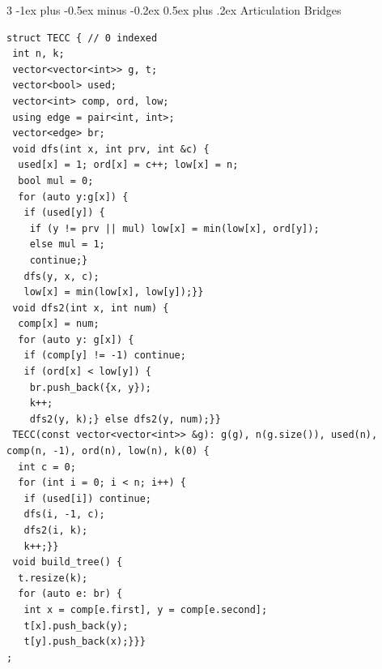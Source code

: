 \documentclass[8pt,a4paper,onesided]{article}
\makeatletter
\renewcommand{\subsection}{\@startsection{subsection}{2}{0mm}
    {-1ex plus -0.5ex minus -0.2ex} %
    {0.5ex plus .2ex}                %
    {\normalfont\large\bfseries}}    %
\makeatother
\begin{document}
\begin{multicols}{3}
\subsection{Articulation Bridges}
\begin{verbatim}
struct TECC { // 0 indexed
 int n, k;
 vector<vector<int>> g, t;
 vector<bool> used;
 vector<int> comp, ord, low;
 using edge = pair<int, int>;
 vector<edge> br;
 void dfs(int x, int prv, int &c) {
  used[x] = 1; ord[x] = c++; low[x] = n;
  bool mul = 0;
  for (auto y:g[x]) {
   if (used[y]) {
    if (y != prv || mul) low[x] = min(low[x], ord[y]);
    else mul = 1;
    continue;}
   dfs(y, x, c);
   low[x] = min(low[x], low[y]);}}
 void dfs2(int x, int num) {
  comp[x] = num;
  for (auto y: g[x]) {
   if (comp[y] != -1) continue;
   if (ord[x] < low[y]) {
    br.push_back({x, y});
    k++;
    dfs2(y, k);} else dfs2(y, num);}}
 TECC(const vector<vector<int>> &g): g(g), n(g.size()), used(n), comp(n, -1), ord(n), low(n), k(0) {
  int c = 0;
  for (int i = 0; i < n; i++) {
   if (used[i]) continue;
   dfs(i, -1, c);
   dfs2(i, k);
   k++;}}
 void build_tree() {
  t.resize(k);
  for (auto e: br) {
   int x = comp[e.first], y = comp[e.second];
   t[x].push_back(y);
   t[y].push_back(x);}}}
;\end{verbatim}

\end{multicols}
\end{document}
